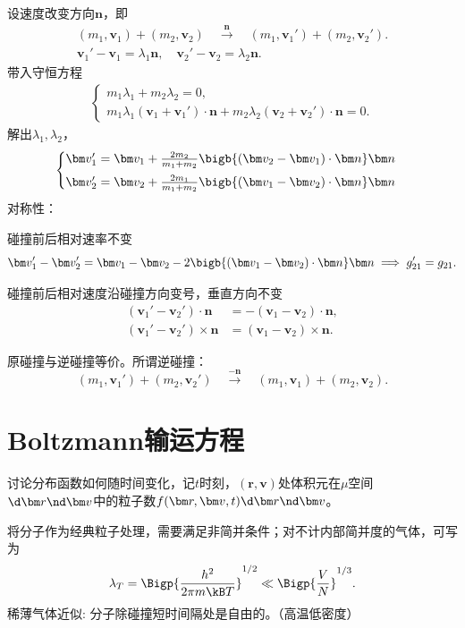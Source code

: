 设速度改变方向$\bm n$，即
\begin{gather*}
	(m_1,\bm v_1)+(m_2,\bm v_2)\quad\overset{\bm n}{\longrightarrow}\quad(m_1,\bm v_1')+(m_2,\bm v_2').\\
	\bm v_1'-\bm v_1=\lambda_1\bm n,\quad\bm v_2'-\bm v_2=\lambda_2\bm n.
\end{gather*}
带入守恒方程
\begin{align*}
	\begin{cases}
		m_1\lambda_1+m_2\lambda_2=0,\\
		m_1\lambda_1(\bm v_1+\bm v_1')\cdot\bm n+m_2\lambda_2(\bm v_2+\bm v_2')\cdot\bm n=0.
	\end{cases}
\end{align*}
解出$\lambda_1,\lambda_2$，
\begin{align}
	\begin{cases}
		\bm v_1'=\bm v_1+\frac{2m_2}{m_1+m_2}\bigb{(\bm v_2-\bm v_1)\cdot\bm n}\bm n\\[1ex]
		\bm v_2'=\bm v_2+\frac{2m_1}{m_1+m_2}\bigb{(\bm v_1-\bm v_2)\cdot\bm n}\bm n
	\end{cases}
\end{align}
对称性：
\begin{compactenum}
	\item 碰撞前后相对速率不变
	\[
		\bm v_1'-\bm v_2'=\bm v_1-\bm v_2-2\bigb{(\bm v_1-\bm v_2)\cdot\bm n}\bm n\implies g_{21}'=g_{21}.
	\]
	\item 碰撞前后相对速度沿碰撞方向变号，垂直方向不变
	\begin{align*}
		(\bm v_1'-\bm v_2')\cdot\bm n&=-(\bm v_1-\bm v_2)\cdot\bm n,\\
		(\bm v_1'-\bm v_2')\times\bm n&=(\bm v_1-\bm v_2)\times\bm n.
	\end{align*}
	\item 原碰撞与逆碰撞等价。所谓逆碰撞：
	\[
		(m_1,\bm v_1')+(m_2,\bm v_2')\quad\overset{-\bm n}{\longrightarrow}\quad(m_1,\bm v_1)+(m_2,\bm v_2).
	\]
\end{compactenum}
\section{Boltzmann输运方程}
讨论分布函数如何随时间变化，记$t$时刻，$(\bm r,\bm v)$处体积元在$\mu$空间$\d\bm r\nd\bm v$中的粒子数$f(\bm r,\bm v,t)\d\bm r\nd\bm v$。

将分子作为经典粒子处理，需要满足非简并条件；对不计内部简并度的气体，可写为
\[
	\lambda_T=\Bigp{\frac{h^2}{2\pi m\kB T}}^{1/2}\ll\Bigp{\frac VN}^{1/3}.
\]
稀薄气体近似: 分子除碰撞短时间隔处是自由的。（高温低密度）

